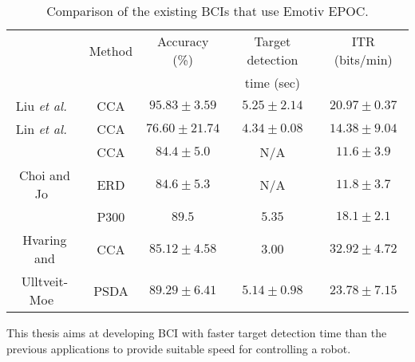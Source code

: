 \newcommand{\liu}{Liu \textit{et al.}~\cite{emotiv_11hz}}
\newcommand{\lin}{Lin \textit{et al.}~\cite{emotiv_walking}}
\newcommand{\choi}{Choi and Jo~\cite{emotiv_hybrid}}
\newcommand{\hvar}{Hvaring and}
\newcommand{\moe}{Ulltveit-Moe~\cite{emotiv_comparison}}
\newcommand{\duvi}{Duvinage \textit{et al.}~\cite{emotiv_p300_comp}}

\begin{table}[h]
	\centering
	\begin{tabular}{|c|c|c|c|c|}\hline
		& Method& Accuracy (\%)		& Target detection 	& ITR (bits/min)	\\
		&		&					& time (sec)		&					\\\hline
\liu	& CCA	& $95.83\pm 3.59$	& $5.25\pm 2.14$	& $20.97\pm 0.37$	\\\hline
\lin	& CCA	& $76.60\pm 21.74$	& $4.34\pm 0.08$	& $14.38\pm 9.04$	\\\hline
		& CCA	& $84.4\pm 5.0$		& N/A				& $11.6\pm 3.9$		\\\cline{2-5}
\choi	& ERD	& $84.6\pm 5.3$		& N/A				& $11.8\pm 3.7$		\\\cline{2-5}
		& P300	& $89.5$			& $5.35$			& $18.1\pm 2.1$		\\\hline
\hvar	& CCA	& $85.12\pm 4.58$	& $3.00$			& $32.92\pm 4.72$	\\\cline{2-5}
\moe	& PSDA	& $89.29\pm 6.41$	& $5.14\pm 0.98$	& $23.78\pm 7.15$	\\\hline
	\end{tabular}
	\caption{Comparison of the existing BCIs that use Emotiv EPOC.}
	\label{tab:emotiv_BCIs}
\end{table}

This thesis aims at developing \gls{BCI} with faster \gls{target} detection time than the previous applications to provide suitable speed for controlling a robot.
